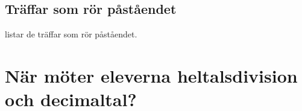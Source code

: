 \section{Träffar som rör påståendet}

 listar de träffar som rör påståendet.




\chapter{När möter eleverna heltalsdivision och decimaltal?}
\label{app:lgr22}

